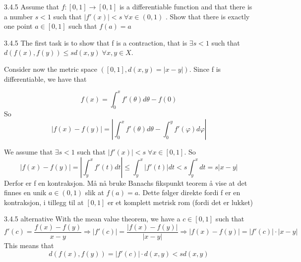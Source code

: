 \documentclass[a4paper,norsk]{article}
\renewcommand{\leq}{\leqslant}
\renewcommand{\phi}{\varphi}
\begin{document}
\begin{oppgavebox}{3.4.5}{}
Assume that $ f : \left[ 0, 1 \right] \to \left[ 0, 1 \right]  $ is a differentiable function and that there is a number $ s< 1 $ such that $ \left| f'(x) \right| < s  \; \forall  x \in \left( 0, 1 \right)   $ . Show that there is exactly one point $ a \in \left[ 0, 1 \right]  $ such that $ f(a) = a $ 

\begin{proofbox}{3.4.5}{}
  The first task is to show that f is a contraction, that is $ \exists  s < 1 $ such that $ d \left( f(x), f(y)  \right) \leq s d \left( x, y \right) \; \forall x,y \in X $.

  Consider now the metric space $ \left( \left[ 0, 1 \right], d \left( x, y \right) = \left| x - y \right|    \right)  $. Since f is differentiable, we have that 

  \[
      f(x) = \int_{0}^{x} f' \left( \theta \right) d \theta - f(0)
  \]
  So 
  \[
      \left| f(x) - f(y) \right| = \left| \int_{0}^{x} f' \left( \theta \right) d \theta - \int_{0}^{y} f' \left( \phi \right) d \phi     \right| 
  \]

  We assume that $ \exists  s < 1 $ such that $ \left| f ' (x) \right| < s \; \forall x \in \left[ 0, 1 \right]  $. So
  \[
      \left| f(x) - f(y) \right| = \left| \int_{y}^{x} f'(t) dt  \right| \leq \int_{y}^{x} \left| f'(t) \right| dt < s \int_{y}^{x} dt = s \left| x -y\right|   
  \]
  Derfor er f en kontraksjon. Må nå bruke Banachs fikspunkt teorem å vise at det finnes en unik $ a \in \left( 0, 1 \right)   $ slik at $ f(a) = a $. Dette følger direkte fordi f er en kontraksjon, i tillegg til at $ \left[ 0, 1 \right]  $ er et komplett metrisk rom (fordi det er lukket)
\end{proofbox}

\begin{proofbox}{3.4.5 alternative}{}
  With the mean value theorem, we have a $ c \in \left[ 0, 1 \right]  $ such that
  \[
      f'(c) = \frac{ f(x) - f(y) }{ x-y } \Rightarrow \left| f'(c) \right|  = \frac{ \left| f(x) - f(y) \right|  }{ \left| x - y \right|  } \Rightarrow \left| f(x) - f(y) \right| = \left| f'(c) \right| \cdot \left| x - y \right| 
  \]
  This means that 
  \[
      d \left( f(x), f(y)  \right) = \left| f'(c) \right| \cdot d \left( x, y \right) < s d \left( x, y \right) 
  \]
  
  
\end{proofbox}
\end{oppgavebox}
\end{document}
